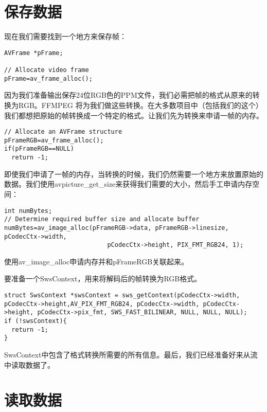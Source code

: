 \section{保存数据}

现在我们需要找到一个地方来保存帧：
\begin{lstlisting}
AVFrame *pFrame;

// Allocate video frame
pFrame=av_frame_alloc();
\end{lstlisting}

因为我们准备输出保存24位RGB色的PPM文件，我们必需把帧的格式从原来的转换为RGB。FFMPEG 将为我们做这些转换。在大多数项目中（包括我们的这个）我们都想把原始的帧转换成一个特定的格式。让我们先为转换来申请一帧的内存。
\begin{lstlisting}
// Allocate an AVFrame structure
pFrameRGB=av_frame_alloc();
if(pFrameRGB==NULL)
  return -1;
\end{lstlisting}

即使我们申请了一帧的内存，当转换的时候，我们仍然需要一个地方来放置原始的数据。我们使用avpicture_get_size来获得我们需要的大小，然后手工申请内存空间：

\begin{lstlisting}
int numBytes;
// Determine required buffer size and allocate buffer
numBytes=av_image_alloc(pFrameRGB->data, pFrameRGB->linesize, pCodecCtx->width,
                            pCodecCtx->height, PIX_FMT_RGB24, 1);
\end{lstlisting}

使用av_image_alloc申请内存并和pFrameRGB关联起来。

要准备一个SwsContext，用来将解码后的帧转换为RGB格式。
\begin{lstlisting}
struct SwsContext *swsContext = sws_getContext(pCodecCtx->width, pCodecCtx->height,AV_PIX_FMT_RGB24, pCodecCtx->width, pCodecCtx->height, pCodecCtx->pix_fmt, SWS_FAST_BILINEAR, NULL, NULL, NULL);
if (!swsContext){
  return -1;
}
\end{lstlisting}

SwsContext中包含了格式转换所需要的所有信息。最后，我们已经准备好来从流中读取数据了。

\section{读取数据}

